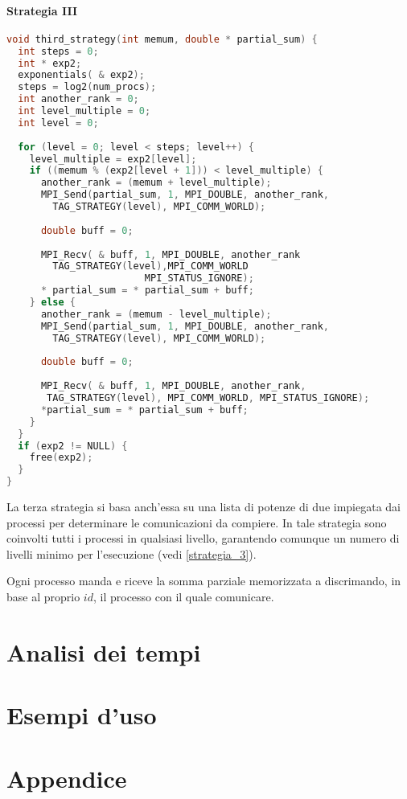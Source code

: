 \documentclass[a4paper,11pt]{book}
\begin{document}
\subsubsection{Strategia III}
\begin{lstlisting}[language=C]
void third_strategy(int memum, double * partial_sum) {
  int steps = 0;
  int * exp2;
  exponentials( & exp2);
  steps = log2(num_procs);
  int another_rank = 0;
  int level_multiple = 0;
  int level = 0;
  
  for (level = 0; level < steps; level++) {
    level_multiple = exp2[level];
    if ((memum % (exp2[level + 1])) < level_multiple) {
      another_rank = (memum + level_multiple);
      MPI_Send(partial_sum, 1, MPI_DOUBLE, another_rank,
        TAG_STRATEGY(level), MPI_COMM_WORLD);
      
      double buff = 0;
      
      MPI_Recv( & buff, 1, MPI_DOUBLE, another_rank
        TAG_STRATEGY(level),MPI_COMM_WORLD   
                        MPI_STATUS_IGNORE);
      * partial_sum = * partial_sum + buff;
    } else {
      another_rank = (memum - level_multiple);
      MPI_Send(partial_sum, 1, MPI_DOUBLE, another_rank,
        TAG_STRATEGY(level), MPI_COMM_WORLD);
      
      double buff = 0;
      
      MPI_Recv( & buff, 1, MPI_DOUBLE, another_rank,
       TAG_STRATEGY(level), MPI_COMM_WORLD, MPI_STATUS_IGNORE);
      *partial_sum = * partial_sum + buff;
    }
  }
  if (exp2 != NULL) {
    free(exp2);
  }
}
\end{lstlisting}
La terza strategia si basa anch'essa su una lista di potenze di due impiegata dai processi per determinare le comunicazioni da compiere. In tale strategia sono coinvolti tutti i processi in qualsiasi livello, garantendo comunque un numero di livelli minimo per l'esecuzione (vedi \ref{strategia_3}).\par 
Ogni processo manda e riceve la somma parziale memorizzata a discrimando, in base al proprio $id$, il processo con il quale comunicare.

\chapter{Analisi dei tempi}
\chapter{Esempi d'uso}
\chapter{Appendice}
\end{document}
